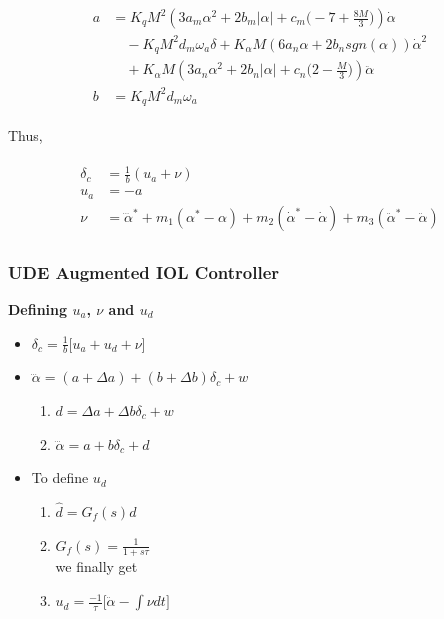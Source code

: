 \documentclass[table,10pt,red]{beamer}	%
\begin{document}
\begin{frame}
\begin{eqnarray*}
	\begin{aligned}
		a &= K_qM^2(3a_m\alpha^2+2b_m|\alpha|+c_m\Big(-7+\frac{8M}{3}\Big))\dot{\alpha} \\ 
		&\quad -K_qM^2d_m\omega_a\delta+K_\alpha M(6a_n\alpha+2b_nsgn(\alpha))\dot{\alpha}^2\\ 
		&\quad+K_\alpha M(3a_n\alpha^2+2b_n|\alpha|+c_n\Big(2-\frac{M}{3}\Big))\ddot{\alpha} \\
		b &= K_q M^2d_m\omega_a \nonumber
	\end{aligned}
	\label{eq5}
\end{eqnarray*}


Thus, 

\begin{eqnarray*}
	\begin{aligned}
		\delta_c &= \frac{1}{b}(u_a+\nu) \\ \label{iol_control}
		u_a &= -a \label{ua_eqn}\\
		\nu &= \dddot{\alpha}^\ast+m_1(\alpha^\ast-\alpha) + m_2(\dot{\alpha}^\ast-\dot{\alpha}) + m_3(\ddot{\alpha}^\ast-\ddot{\alpha}) \label{nu_eqn}
	\end{aligned}
	\label{eq5}
\end{eqnarray*}

\end{frame}
\begin{frame}
\frametitle{UDE Augmented IOL Controller}
\textbf{Defining $u_a$, $\nu$ and $u_d$}
\begin{itemize}  %
		\item $\delta_c = \frac{1}{b}\Big[u_a+u_d+\nu\Big] $
		\item $\dddot{\alpha}=(a + \Delta a) + (b + \Delta b)\delta_c + w \nonumber$
				\begin{enumerate}
					\item $d = \Delta a + \Delta b \delta_c + w$
					\item $\dddot{\alpha} = a + b\delta_c + d \nonumber$ 
				\end{enumerate}
		\item To define $u_d$
				\begin{enumerate}
					\item $\hat{d}=G_f(s)d$
					\item $G_f(s)=\frac{1}{1+s\tau}$ \\
					we finally get
					\item $u_d=\frac{-1}{\tau}\Big[\ddot{\alpha}-\int{\nu dt}\Big] \label{ude}$
				\end{enumerate}
\end{itemize}
\end{frame}
\end{document}
